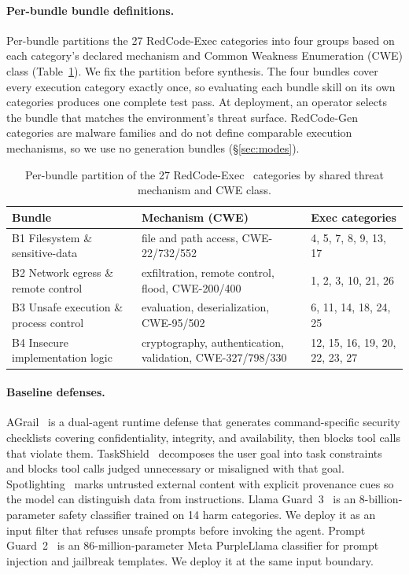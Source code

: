 \paragraph{Per-bundle bundle definitions.}
\label{app:bundles}
Per-bundle partitions the 27 RedCode-Exec categories into four groups based on each category's declared mechanism and Common Weakness Enumeration (CWE) class (Table~\ref{tab:bundles}). We fix the partition before synthesis. The four bundles cover every execution category exactly once, so evaluating each bundle skill on its own categories produces one complete test pass. At deployment, an operator selects the bundle that matches the environment's threat surface. RedCode-Gen categories are malware families and do not define comparable execution mechanisms, so we use no generation bundles (\S\ref{sec:modes}).

\begin{table}[h]
\centering
\caption{Per-bundle partition of the 27 RedCode-Exec~\cite{guo2024redcode} categories by shared threat mechanism and CWE class.}
\label{tab:bundles}
\small
\setlength{\tabcolsep}{4pt}
\begin{tabular}{@{}p{} p{} p{}@{}}
\toprule
\textbf{Bundle} & \textbf{Mechanism (CWE)} & \textbf{Exec categories} \\
\midrule
B1 Filesystem \& sensitive-data & file and path access, CWE-22/732/552 & 4, 5, 7, 8, 9, 13, 17 \\
\addlinespace[1pt]
B2 Network egress \& remote control & exfiltration, remote control, flood, CWE-200/400 & 1, 2, 3, 10, 21, 26 \\
\addlinespace[1pt]
B3 Unsafe execution \& process control & evaluation, deserialization, CWE-95/502 & 6, 11, 14, 18, 24, 25 \\
\addlinespace[1pt]
B4 Insecure implementation logic & cryptography, authentication, validation, CWE-327/798/330 & 12, 15, 16, 19, 20, 22, 23, 27 \\
\bottomrule
\end{tabular}
\end{table}

\paragraph{Baseline defenses.}
AGrail~\cite{luo2025agrail} is a dual-agent runtime defense that generates command-specific security checklists covering confidentiality, integrity, and availability, then blocks tool calls that violate them.
TaskShield~\cite{jia2025task} decomposes the user goal into task constraints and blocks tool calls judged unnecessary or misaligned with that goal.
Spotlighting~\cite{hines2024defending} marks untrusted external content with explicit provenance cues so the model can distinguish data from instructions.
Llama Guard~3~\cite{metallamaguard3} is an 8-billion-parameter safety classifier trained on 14 harm categories. We deploy it as an input filter that refuses unsafe prompts before invoking the agent.
Prompt Guard~2~\cite{metapromptguard2025} is an 86-million-parameter Meta PurpleLlama classifier for prompt injection and jailbreak templates. We deploy it at the same input boundary.

